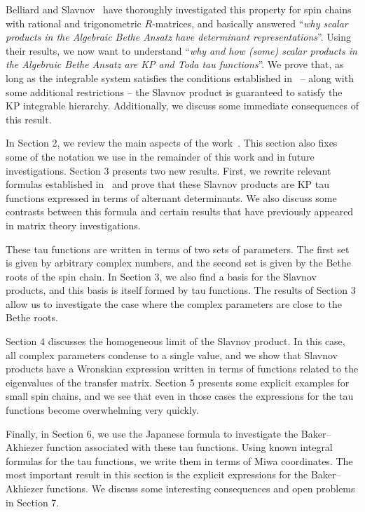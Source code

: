 \documentclass[a4paper,12pt]{amsart}
\begin{document}
Belliard and Slavnov~\cite{Belliard:2019bfz} have thoroughly
investigated this property for spin chains with rational and
trigonometric \(R\)-matrices, and basically answered ``\emph{why
scalar products in the Algebraic Bethe Ansatz have determinant
representations}''. Using their results, we now want to understand
``\emph{why and how (some) scalar products in the Algebraic Bethe
Ansatz are KP and Toda tau functions}''. We prove that, as long as the
integrable system satisfies the conditions established
in~\cite{Belliard:2019bfz} -- along with some additional restrictions
-- the Slavnov product is guaranteed to satisfy the KP integrable
hierarchy. Additionally, we discuss some immediate consequences of
this result.

In Section 2, we review the main aspects of the
work~\cite{Belliard:2019bfz}. This section also fixes some of the
notation we use in the remainder of this work and in future
investigations. Section 3 presents two new results. First, we rewrite
relevant formulas established in~\cite{Belliard:2019bfz} and prove
that these Slavnov products are KP tau functions expressed in terms of
alternant determinants. We also discuss some contrasts between this
formula and certain results that have previously appeared in matrix
theory investigations.

These tau functions are written in terms of two sets of
parameters. The first set is given by arbitrary complex numbers, and
the second set is given by the Bethe roots of the spin chain.  In
Section 3, we also find a basis for the Slavnov products, and this
basis is itself formed by tau functions. The results of Section 3
allow us to investigate the case where the complex parameters are
close to the Bethe roots.

Section 4 discusses the homogeneous limit of the Slavnov product.  In
this case, all complex parameters condense to a single value, and we
show that Slavnov products have a Wronskian expression written in
terms of functions related to the eigenvalues of the transfer matrix.
Section 5 presents some explicit examples for small spin chains, and
we see that even in those cases the expressions for the tau functions
become overwhelming very quickly.

Finally, in Section 6, we use the Japanese formula to investigate the
Baker–Akhiezer function associated with these tau functions. Using
known integral formulas for the tau functions, we write them in terms
of Miwa coordinates. The most important result in this section is the
explicit expressions for the Baker–Akhiezer functions. We discuss some
interesting consequences and open problems in Section 7.
\end{document}
